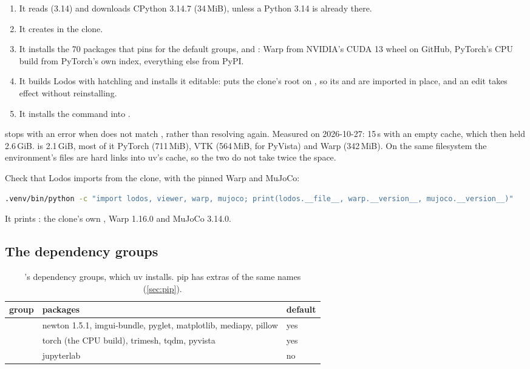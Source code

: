 \begin{enumerate}
\item It reads  (3.14) and downloads CPython 3.14.7 (34\,MiB), unless a Python 3.14 is already there.
\item It creates  in the clone.
\item It installs the 70 packages that  pins for the default groups,  and : Warp from NVIDIA's CUDA 13 wheel on GitHub, PyTorch's CPU build from PyTorch's own index, everything else from PyPI.
\item It builds Lodos with hatchling and installs it editable:  puts the clone's root on , so its  and  are imported in place, and an edit takes effect without reinstalling.
\item It installs the  command into .
\end{enumerate}

 stops with an error when  does not match , rather than resolving again. Measured on 2026-10-27: 15\,s with an empty cache, which then held 2.6\,GiB.  is 2.1\,GiB, most of it PyTorch (711\,MiB), VTK (564\,MiB, for PyVista) and Warp (342\,MiB). On the same filesystem the environment's files are hard links into uv's cache, so the two do not take twice the space.

Check that Lodos imports from the clone, with the pinned Warp and MuJoCo:

\begin{lstlisting}[language=bash]
.venv/bin/python -c "import lodos, viewer, warp, mujoco; print(lodos.__file__, warp.__version__, mujoco.__version__)"
\end{lstlisting}

It prints : the clone's own , Warp 1.16.0 and MuJoCo 3.14.0.

\subsection{The dependency groups}\label{sec:groups}

\begin{table}[h]
\centering
\caption{'s dependency groups, which uv installs. pip has extras of the same names (\cref{sec:pip}).}
\label{tab:groups}
\small
\begin{tabularx}{\linewidth}{@{}L{20mm}YL{14mm}@{}}
\toprule
group & packages & default \\
\midrule
{} & newton 1.5.1, imgui-bundle, pyglet, matplotlib, mediapy, pillow & yes \\
 & torch (the CPU build), trimesh, tqdm, pyvista & yes \\
 & jupyterlab & no \\
\bottomrule
\end{tabularx}
\end{table}

